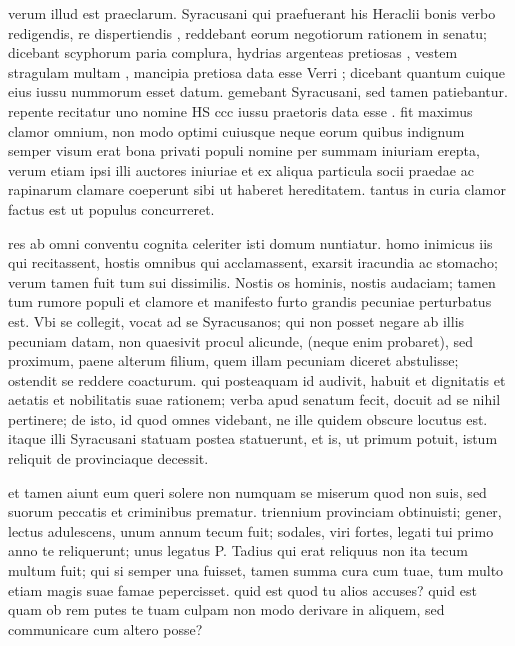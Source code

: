  verum illud est praeclarum. Syracusani qui praefuerant his Heraclii bonis verbo redigendis, re dispertiendis , reddebant eorum negotiorum rationem in senatu; dicebant scyphorum paria complura, hydrias argenteas pretiosas , vestem stragulam multam , mancipia pretiosa data esse Verri ; dicebant quantum cuique eius iussu nummorum esset datum. gemebant Syracusani, sed tamen patiebantur. repente recitatur uno nomine HS ccc iussu praetoris data esse . fit maximus clamor omnium, non modo optimi cuiusque neque eorum quibus indignum semper visum erat bona privati populi nomine per summam iniuriam erepta, verum etiam ipsi illi auctores iniuriae et ex aliqua particula socii praedae ac rapinarum clamare coeperunt sibi ut haberet hereditatem. tantus in curia clamor factus est ut populus concurreret.

 res ab omni conventu cognita celeriter isti domum nuntiatur. homo inimicus iis qui recitassent, hostis omnibus qui acclamassent, exarsit iracundia ac stomacho; verum tamen fuit tum sui dissimilis. Nostis os hominis, nostis audaciam; tamen tum rumore populi et clamore et manifesto furto grandis pecuniae perturbatus est. Vbi se collegit, vocat ad se Syracusanos; qui non posset negare ab illis pecuniam datam, non quaesivit procul alicunde, (neque enim probaret), sed proximum, paene alterum filium, quem illam pecuniam diceret abstulisse; ostendit se reddere coacturum. qui posteaquam id audivit, habuit et dignitatis et aetatis et nobilitatis suae rationem; verba apud senatum fecit, docuit ad se nihil pertinere; de isto, id quod omnes videbant, ne ille quidem obscure locutus est. itaque illi Syracusani statuam postea statuerunt, et is, ut primum potuit, istum reliquit de provinciaque decessit.

 et tamen aiunt eum queri solere non numquam se miserum quod non suis, sed suorum peccatis et criminibus prematur. triennium provinciam obtinuisti; gener, lectus adulescens, unum annum tecum fuit; sodales, viri fortes, legati tui primo anno te reliquerunt; unus legatus P. Tadius qui erat reliquus non ita tecum multum fuit; qui si semper una fuisset, tamen summa cura cum tuae, tum multo etiam magis suae famae pepercisset. quid est quod tu alios accuses? quid est quam ob rem putes te tuam culpam non modo derivare in aliquem, sed communicare cum altero posse?

